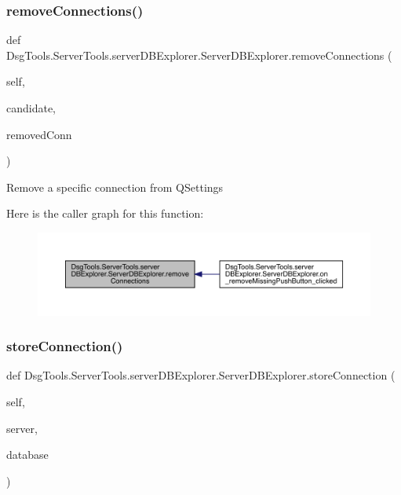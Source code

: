 \subsubsection{\texorpdfstring{remove\+Connections()}{removeConnections()}}
{\footnotesize\ttfamily def Dsg\+Tools.\+Server\+Tools.\+server\+D\+B\+Explorer.\+Server\+D\+B\+Explorer.\+remove\+Connections (\begin{DoxyParamCaption}\item[{}]{self,  }\item[{}]{candidate,  }\item[{}]{removed\+Conn }\end{DoxyParamCaption})}

\begin{DoxyVerb}Remove a specific connection from QSettings
\end{DoxyVerb}
 Here is the caller graph for this function\+:
\nopagebreak
\begin{figure}[H]
\begin{center}
\leavevmode
\includegraphics[width=350pt]{class_dsg_tools_1_1_server_tools_1_1server_d_b_explorer_1_1_server_d_b_explorer_a36574ae8ee6a72558eee39546b7f1342_icgraph}
\end{center}
\end{figure}
\mbox{\label{class_dsg_tools_1_1_server_tools_1_1server_d_b_explorer_1_1_server_d_b_explorer_a7aeedde826e8871d6b9d365a173b4916}} 
\subsubsection{\texorpdfstring{store\+Connection()}{storeConnection()}}
{\footnotesize\ttfamily def Dsg\+Tools.\+Server\+Tools.\+server\+D\+B\+Explorer.\+Server\+D\+B\+Explorer.\+store\+Connection (\begin{DoxyParamCaption}\item[{}]{self,  }\item[{}]{server,  }\item[{}]{database }\end{DoxyParamCaption})}

